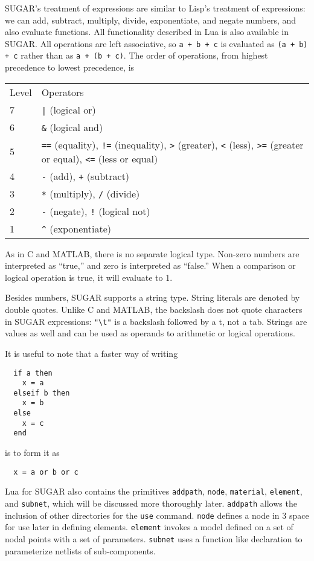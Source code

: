 SUGAR's treatment of expressions are similar to Lisp's treatment of expressions: we can 
add, subtract, multiply, divide, exponentiate, and negate numbers, and also 
evaluate functions. All functionality described in Lua is also available in 
SUGAR. All operations are left associative, so \texttt{a + b + c} is 
evaluated as 
\texttt{(a + b) + c} rather than as \texttt{a + (b + c)}.  The order of operations, from highest precedence
to lowest precedence, is
\begin{center}
\begin{tabular}{|l|l|}
\hline
Level & Operators \\
7 & \verb+|+ (logical or)\\
6 & \verb+&+ (logical and)\\
5 & \texttt{==} (equality), \texttt{!=} (inequality), 
    \texttt{>} (greater), \texttt{<} (less), 
    \texttt{>=} (greater or equal), \texttt{<=} (less or equal)\\
4 & \texttt{-} (add), \texttt{+} (subtract)\\
3 & \texttt{*} (multiply), \texttt{/} (divide)\\
2 & \texttt{-} (negate), \texttt{!} (logical not)\\
1 & \verb+^+ (exponentiate) \\
\hline
\end{tabular}
\end{center}

As in C and MATLAB, there is no separate logical type.  Non-zero numbers
are interpreted as ``true,'' and zero is interpreted as ``false.''  When
a comparison or logical operation is true, it will evaluate to 1.

Besides numbers, SUGAR supports a string type.  String literals are denoted
by double quotes.  Unlike C and MATLAB, the backslash does not quote
characters in SUGAR expressions: \verb+"\t"+ is a backslash followed by
a t, not a tab.  Strings are values as well and can be used as operands
to arithmetic or logical operations. 

It is useful to note that a faster way of writing
\begin{verbatim}
  if a then
    x = a
  elseif b then
    x = b
  else
    x = c
  end
\end{verbatim}
is to form it as
\begin{verbatim}
  x = a or b or c
\end{verbatim}

Lua for SUGAR also contains the primitives {\tt addpath},
{\tt node}, {\tt material}, {\tt element}, and {\tt subnet}, which will be 
discussed more thoroughly later. {\tt addpath} allows the inclusion of other 
directories for the {\tt use} command. {\tt node} defines a node in 3 space 
for use later in defining elements. {\tt element} invokes a model defined on 
a set of nodal points with a set of parameters. {\tt subnet} uses a function 
like declaration to parameterize netlists of sub-components.


